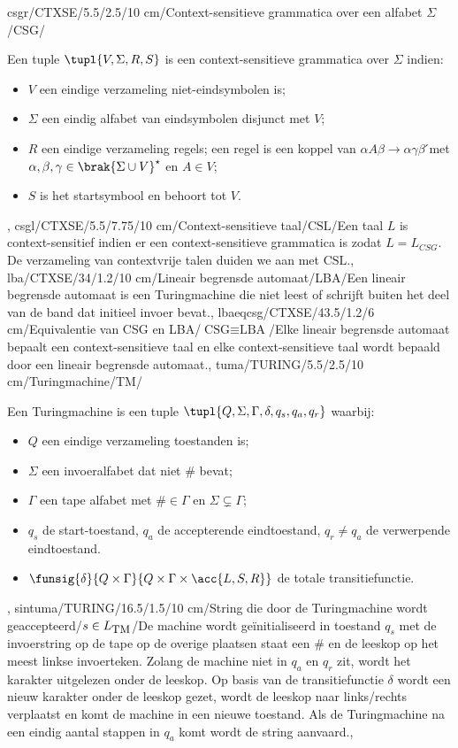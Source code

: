 csgr/CTXSE/5.5/2.5/10 cm/Context-sensitieve grammatica over een alfabet $\Sigma$/CSG/{Een tuple $\tupl{V,\Sigma,R,S}$ is een context-sensitieve grammatica over $\Sigma$ indien:\begin{itemize}
 \item $V$ een eindige verzameling niet-eindsymbolen is;
 \item $\Sigma$ een eindig alfabet van eindsymbolen disjunct met $V$;
 \item $R$ een eindige verzameling regels; een regel is een koppel van $\alpha A\beta\rightarrow\alpha\gamma\beta$ ́met $\alpha,\beta,\gamma\in\brak{\Sigma\cup V}^{\star}$ en $A\in V$;
 \item $S$ is het startsymbool en behoort tot $V$.
\end{itemize}},
csgl/CTXSE/5.5/7.75/10 cm/Context-sensitieve taal/$\mbox{CSL}$/{Een taal $L$ is context-sensitief indien er een context-sensitieve grammatica is zodat $L=L_{CSG}$. De verzameling van contextvrije talen duiden we aan met $\mbox{CSL}$.},
lba/CTXSE/34/1.2/10 cm/Lineair begrensde automaat/LBA/{Een lineair begrensde automaat is een Turingmachine die niet leest of schrijft buiten het deel van de band dat initieel invoer bevat.},
lbaeqcsg/CTXSE/43.5/1.2/6 cm/Equivalentie van CSG en LBA/$\mbox{CSG}\equiv\mbox{LBA}$/{Elke lineair begrensde automaat bepaalt een context-sensitieve taal en elke context-sensitieve taal wordt bepaald door een lineair begrensde automaat.},
tuma/TURING/5.5/2.5/10 cm/Turingmachine/TM/{Een Turingmachine is een tuple $\tupl{Q,\Sigma,\Gamma,\delta,q_s,q_a,q_r}$ waarbij:\begin{itemize}
 \item $Q$ een eindige verzameling toestanden is;
 \item $\Sigma$ een invoeralfabet dat niet $\#$ bevat;
 \item $\Gamma$ een tape alfabet met $\#\in\Gamma$ en $\Sigma\subsetneq\Gamma$;
 \item $q_s$ de start-toestand, $q_a$ de accepterende eindtoestand, $q_r\neq q_a$ de verwerpende eindtoestand.
 \item $\funsig{\delta}{Q\times\Gamma}{Q\times\Gamma\times\acc{L,S,R}}$ de totale transitiefunctie.
\end{itemize}},
sintuma/TURING/16.5/1.5/10 cm/String die door de Turingmachine wordt geaccepteerd/$s\in L_{\mbox{\small TM}}$/{De machine wordt ge\"initialiseerd in toestand $q_s$ met de invoerstring op de tape op de overige plaatsen staat een $\#$ en de leeskop op het meest linkse invoerteken. Zolang de machine niet in $q_a$ en $q_r$ zit, wordt het karakter uitgelezen onder de leeskop. Op basis van de transitiefunctie $\delta$ wordt een nieuw karakter onder de leeskop gezet, wordt de leeskop naar links/rechts verplaatst en komt de machine in een nieuwe toestand. Als de Turingmachine na een eindig aantal stappen in $q_a$ komt wordt de string aanvaard.},
